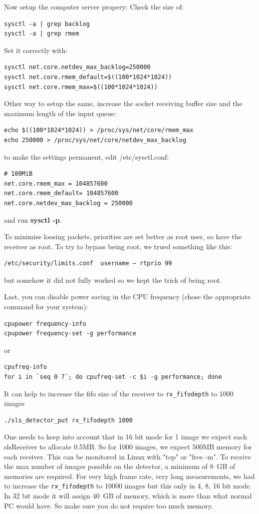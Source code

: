 \documentclass{article}
\begin{document}
{{{Now setup the computer server propery:
Check the size of: 
\begin{verbatim}
sysctl -a | grep backlog
sysctl -a | grep rmem
\end{verbatim}
Set it correctly with: 
\begin{verbatim}
sysctl net.core.netdev_max_backlog=250000
sysctl net.core.rmem_default=$((100*1024*1024))
sysctl net.core.rmem_max=$((100*1024*1024))
\end{verbatim}

Other way to setup the same,  increase the socket receiving buffer size and the maximum length of the input queue:
\begin{verbatim}
echo $((100*1024*1024)) > /proc/sys/net/core/rmem_max
echo 250000 > /proc/sys/net/core/netdev_max_backlog
\end{verbatim}
to make the settings permanent, edit /etc/sysctl.conf:
 \begin{verbatim}
# 100MiB
net.core.rmem_max = 104857600
net.core.rmem_default= 104857600
net.core.netdev_max_backlog = 250000
\end{verbatim}
and run \textbf{sysctl -p}.

To minimise loosing packets, priorities are set better as root user, so have the receiver as root.
To try to bypass being root, we trued something like this:
\begin{verbatim}
/etc/security/limits.conf  username – rtprio 99
\end{verbatim}
but somehow it did  not fully worked  so we kept the trick of being root.

Last, you can disable power saving in the CPU frequency (chose the appropriate command for your system):
\begin{verbatim}
cpupower frequency-info
cpupower frequency-set -g performance 
\end{verbatim}
or
\begin{verbatim}
cpufreq-info
for i in `seq 0 7`; do cpufreq-set -c $i -g performance; done
\end{verbatim}

It can help to increase the fifo size of the receiver to {\tt{rx\_fifodepth}} to 1000 images
\begin{verbatim}
./sls_detector_put rx_fifodepth 1000
\end{verbatim}
One needs to keep into account that in 16 bit mode for 1 image we expect each slsReceiver  to allocate 0.5MB. So for 1000 images, we expect  500MB memory for each receiver. This can be monitored in Linux with "top" or "free -m". To receive the max number of images possible on the detector, a minimum of 8~GB of memories are required.
For very high frame rate, very long measurements, we had to increase the {\tt{rx\_fifodepth}} to 10000 images but this only in 4, 8, 16 bit mode. In 32 bit mode it will assign 40~GB of memory, which is more than what normal PC would have. So make sure you do not require too much memory.  

}}}
\end{document}
